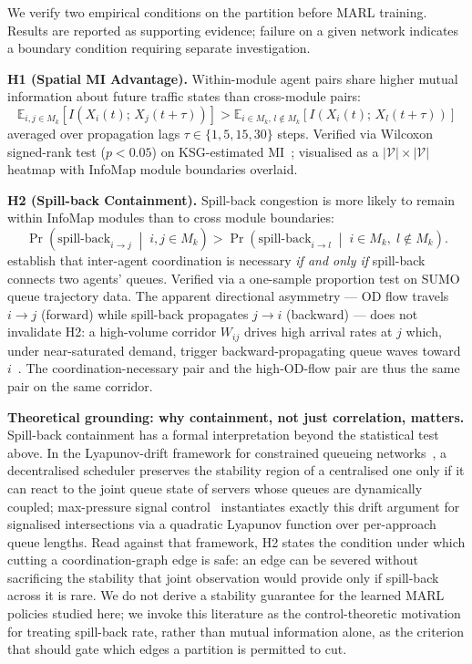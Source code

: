 \documentclass{article}
\begin{document}
We verify two empirical conditions on the partition before MARL training.
Results are reported as supporting evidence; failure on a given network
indicates a boundary condition requiring separate investigation.

\medskip
\noindent\textbf{H1 (Spatial MI Advantage).}
Within-module agent pairs share higher mutual information about future traffic
states than cross-module pairs:
\begin{equation}
    \mathbb{E}_{i,j\in M_k}\!\left[I(X_i(t);\, X_j(t{+}\tau))\right]
    >
    \mathbb{E}_{i\in M_k,\, l\notin M_k}\!\left[I(X_i(t);\, X_l(t{+}\tau))\right]
    \label{eq:h1}
\end{equation}
averaged over propagation lags $\tau \in \{1, 5, 15, 30\}$ steps.
Verified via Wilcoxon signed-rank test ($p < 0.05$) on KSG-estimated
MI~\citep{kraskov2004ksg}; visualised as a $|\mathcal{V}|\times|\mathcal{V}|$
heatmap with InfoMap module boundaries overlaid.

\medskip
\noindent\textbf{H2 (Spill-back Containment).}
Spill-back congestion is more likely to remain within InfoMap modules than to
cross module boundaries:
\begin{equation}
    \Pr\!\left(\text{spill-back}_{i\to j}
    \;\middle|\; i,j \in M_k\right)
    >
    \Pr\!\left(\text{spill-back}_{i\to l}
    \;\middle|\; i \in M_k,\; l \notin M_k\right).
    \label{eq:h2}
\end{equation}
\citet{dependencydyn2025} establish that inter-agent coordination is necessary
\emph{if and only if} spill-back connects two agents' queues.
Verified via a one-sample proportion test on SUMO queue trajectory data.
The apparent directional asymmetry --- OD flow travels $i \to j$ (forward) while
spill-back propagates $j \to i$ (backward) --- does not invalidate H2: a
high-volume corridor $W_{ij}$ drives high arrival rates at $j$ which, under
near-saturated demand, trigger backward-propagating queue waves toward
$i$~\citep{dependencydyn2025}.
The coordination-necessary pair and the high-OD-flow pair are thus the same pair
on the same corridor.

\medskip
\noindent\textbf{Theoretical grounding: why containment, not just correlation, matters.}
Spill-back containment has a formal interpretation beyond the statistical test above.
In the Lyapunov-drift framework for constrained queueing networks~\citep{tassiulas1992stability},
a decentralised scheduler preserves the stability region of a centralised one only if it
can react to the joint queue state of servers whose queues are dynamically coupled;
max-pressure signal control~\citep{varaiya2013maxpressure} instantiates exactly this
drift argument for signalised intersections via a quadratic Lyapunov function over
per-approach queue lengths.
Read against that framework, H2 states the condition under which cutting a
coordination-graph edge is safe: an edge can be severed without sacrificing the
stability that joint observation would provide only if spill-back across it is rare.
We do not derive a stability guarantee for the learned MARL policies studied here;
we invoke this literature as the control-theoretic motivation for treating spill-back
rate, rather than mutual information alone, as the criterion that should gate which
edges a partition is permitted to cut.
\end{document}
